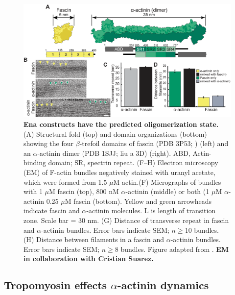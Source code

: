 \begin{figure}
\centering
\includegraphics[width=14cm]{img/ch03/Thesis_EM_fig.png}
\caption[Ena constructs have the predicted oligomerization state.]{\textbf{Ena constructs have the predicted oligomerization state.} (A) Structural fold (top) and domain organizations (bottom) showing the four $\beta$-trefoil domains of fascin (PDB 3P53; \citep{jansen_mechanism_2011}) (left) and an $\alpha$-actinin dimer (PDB 1SJJ; {liu a 3D}) (right). ABD, Actin-binding domain; SR, spectrin repeat. (F–H) Electron microscopy (EM) of F-actin bundles negatively stained with uranyl acetate, which were formed from 1.5 $\mu$M actin.(F) Micrographs of bundles with 1 $\mu$M fascin (top), 800 nM $\alpha$-actinin (middle) or both (1 $\mu$M $\alpha$-actinin 0.25 $\mu$M fascin (bottom). Yellow and green arrowheads indicate fascin and $\alpha$-actinin molecules. L is length of transition zone. Scale bar = 30 nm. (G) Distance of transverse repeat in fascin and $\alpha$-actinin bundles. Error bars indicate SEM; $n\geq10$ bundles. (H) Distance between filaments in a fascin and $\alpha$-actinin bundles. Error bars indicate SEM; $n\geq8$ bundles. Figure adapted from \citep{winkelman_fascin-_2016}. \textbf{EM in collaboration with Cristian Suarez.}}
\label{fig:em_fascin_aact}
\end{figure}

\subsection{Tropomyosin effects \texorpdfstring{$\alpha$}{a}-actinin dynamics}


